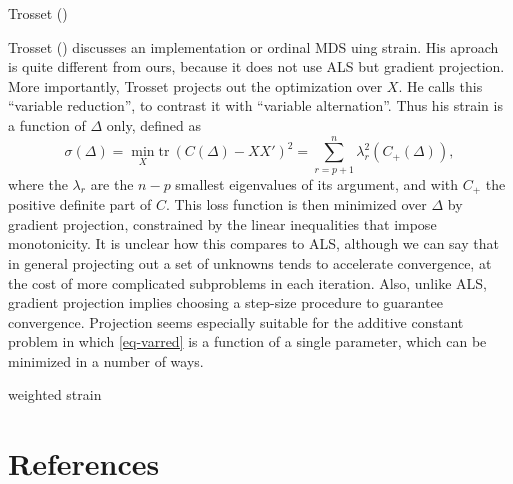 \documentclass[
  12pt,
  letterpaper,
  DIV=11,
  numbers=noendperiod]{scrartcl}
\newcommand{\sectionbreak}{\clearpage}
\begin{document}
Trosset ()

Trosset () discusses an implementation or
ordinal MDS uing strain. His aproach is quite different from ours,
because it does not use ALS but gradient projection. More importantly,
Trosset projects out the optimization over \(X\). He calls this
``variable reduction'', to contrast it with ``variable alternation''.
Thus his strain is a function of \(\Delta\) only, defined as
\begin{equation}
\sigma(\Delta)=\min_X\text{tr}\ (C(\Delta)- XX')^2=\sum_{r=p+1}^n\lambda_r^2(C_+(\Delta)),
\label{eq-varred}
\end{equation} where the \(\lambda_r\) are the \(n-p\) smallest
eigenvalues of its argument, and with \(C_+\) the positive definite part
of \(C\). This loss function is then minimized over \(\Delta\) by
gradient projection, constrained by the linear inequalities that impose
monotonicity. It is unclear how this compares to ALS, although we can
say that in general projecting out a set of unknowns tends to accelerate
convergence, at the cost of more complicated subproblems in each
iteration. Also, unlike ALS, gradient projection implies choosing a
step-size procedure to guarantee convergence. Projection seems
especially suitable for the additive constant problem in which
\eqref{eq-varred} is a function of a single parameter, which can be
minimized in a number of ways.

weighted strain

\sectionbreak

\section*{References}\label{references}
\end{document}
